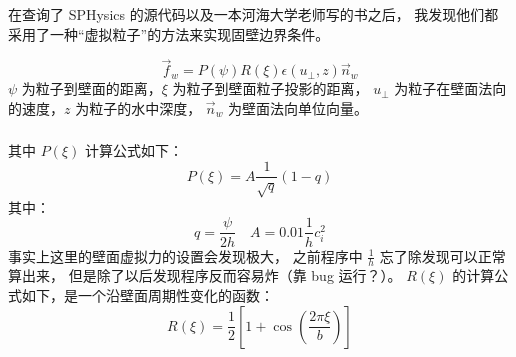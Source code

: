 \begin{frame}
    \frametitle{\subsecname}
    在查询了 SPHysics 的源代码以及一本河海大学老师写的书之后，
    我发现他们都采用了一种“虚拟粒子”的方法来实现固壁边界条件。
    \begin{figure}[H]
        \centering
    \end{figure}
    \begin{equation}
        \vec{f}_w=P(\psi)R(\xi)\epsilon(u_{\perp},z)\vec{n}_w
    \end{equation}
    $\psi$ 为粒子到壁面的距离，$\xi$ 为粒子到壁面粒子投影的距离，
    $u_{\perp}$ 为粒子在壁面法向的速度，$z$ 为粒子的水中深度，
    $\vec{n}_w$ 为壁面法向单位向量。
\end{frame}

\begin{frame}
    \frametitle{\subsecname}
    其中 $P(\xi)$ 计算公式如下：
    \begin{equation}
        P(\xi)=A\frac{1}{\sqrt{q}}(1-q)
    \end{equation}
    其中：
    \begin{equation}
        q=\frac{\psi}{2h}\quad A = 0.01\frac{1}{h}c_i^2
    \end{equation}
    事实上这里的壁面虚拟力的设置会发现极大，
    之前程序中 $\frac{1}{h}$ 忘了除发现可以正常算出来，
    但是除了以后发现程序反而容易炸（靠 bug 运行？）。
    $R(\xi)$ 的计算公式如下，是一个沿壁面周期性变化的函数：
    \begin{equation}
        R(\xi)=\frac{1}{2}\left[
            1+\cos\left(\frac{2\pi\xi}{b}\right)
        \right]
    \end{equation}
\end{frame}

